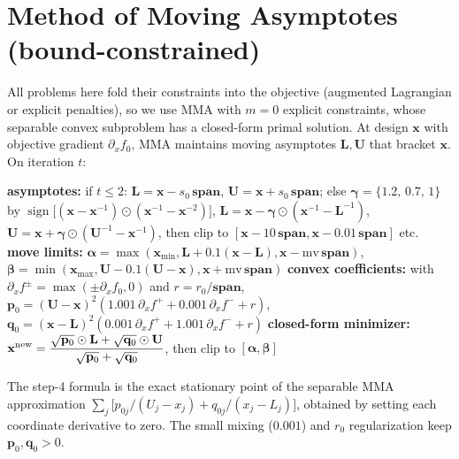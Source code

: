 \documentclass[11pt]{article}
\newcommand{\vx}{\mathbf{x}}
\begin{document}
\section{Method of Moving Asymptotes (bound-constrained)}
All problems here fold their constraints into the objective (augmented Lagrangian
or explicit penalties), so we use MMA with $m=0$ explicit constraints, whose
separable convex subproblem has a closed-form primal solution. At design $\vx$
with objective gradient $\partial_x f_0$, MMA maintains moving asymptotes
$\mathbf L,\mathbf U$ that bracket $\vx$. On iteration $t$:

\begin{algorithm}[h]
\caption{MMA update (\texttt{MMA.update})}
\begin{algorithmic}[1]
\State \textbf{asymptotes:} if $t\le2$: $\mathbf L=\vx-s_0\,\mathbf{span}$,
  $\mathbf U=\vx+s_0\,\mathbf{span}$; \; else
  $\bm\gamma=\{1.2,\,0.7,\,1\}$ by $\operatorname{sign}\!\bigl[(\vx-\vx^{-1})
  \odot(\vx^{-1}-\vx^{-2})\bigr]$,
\Statex \hspace{1.2em}$\mathbf L=\vx-\bm\gamma\odot(\vx^{-1}-\mathbf L^{-1})$,\;
  $\mathbf U=\vx+\bm\gamma\odot(\mathbf U^{-1}-\vx^{-1})$, then clip to
  $[\vx-10\,\mathbf{span},\vx-0.01\,\mathbf{span}]$ etc.
\State \textbf{move limits:} $\bm\alpha=\max(\vx_{\min},\mathbf L+0.1(\vx-\mathbf
  L),\vx-\text{mv}\,\mathbf{span})$, \;
  $\bm\beta=\min(\vx_{\max},\mathbf U-0.1(\mathbf U-\vx),\vx+\text{mv}\,
  \mathbf{span})$
\State \textbf{convex coefficients:} with
  $\partial_x f^\pm=\max(\pm\partial_x f_0,0)$ and $r=r_0/\mathbf{span}$,
\Statex \hspace{1.2em}$\mathbf p_0=(\mathbf U-\vx)^2(1.001\,\partial_xf^{+}
  +0.001\,\partial_xf^{-}+r)$,\;
  $\mathbf q_0=(\vx-\mathbf L)^2(0.001\,\partial_xf^{+}+1.001\,\partial_xf^{-}+r)$
\State \textbf{closed-form minimizer:}
  $\displaystyle \vx^{\rm new}=\frac{\sqrt{\mathbf p_0}\odot\mathbf L
  +\sqrt{\mathbf q_0}\odot\mathbf U}{\sqrt{\mathbf p_0}+\sqrt{\mathbf q_0}}$,
  then clip to $[\bm\alpha,\bm\beta]$
\end{algorithmic}
\end{algorithm}

The step-4 formula is the exact stationary point of the separable MMA
approximation $\sum_j\bigl[p_{0j}/(U_j-x_j)+q_{0j}/(x_j-L_j)\bigr]$, obtained by
setting each coordinate derivative to zero. The small mixing ($0.001$) and
$r_0$ regularization keep $\mathbf p_0,\mathbf q_0>0$.
\end{document}
